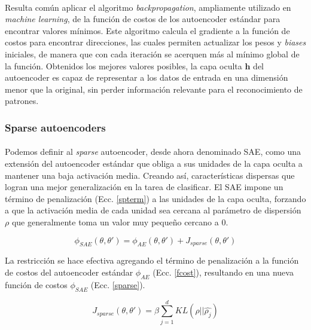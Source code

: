 \documentclass[12pt]{article}%
\begin{document}
\paragraph{}
Resulta común aplicar el algoritmo \textit{backpropagation}, ampliamente utilizado en \textit{machine learning}, de la función de costos de los autoencoder estándar para encontrar valores mínimos. Este algoritmo calcula el gradiente a la función de costos para encontrar direcciones, las cuales permiten actualizar los pesos y \textit{biases} iniciales, de manera que con cada iteración se acerquen más al mínimo global de la función. Obtenidos los mejores valores posibles, la capa oculta $\textbf{h}$ del autoencoder es capaz de representar a los datos de entrada en una dimensión menor que la original, sin perder información relevante para el reconocimiento de patrones.

\subsubsection{Sparse autoencoders}

\paragraph{}
Podemos definir al \textit{sparse} autoencoder, desde ahora denominado SAE, como una extensión del autoencoder estándar que obliga a sus unidades de la capa oculta a mantener una baja activación media. Creando así, características dispersas que logran una mejor generalización en la tarea de clasificar\cite{du}. El SAE impone un término de penalización (Ecc. \ref{spterm}) a las unidades de la capa oculta, forzando a que la activación media de cada unidad sea cercana al parámetro de dispersión $\rho$ que generalmente toma un valor muy pequeño cercano a 0. 

\begin{equation}
\label{sparse}
\phi_{SAE}(\theta,\theta')=\phi_{AE}(\theta,\theta')+J_{sparse}(\theta,\theta')
\end{equation}

La restricción se hace efectiva agregando el término de penalización a la función de costos del autoencoder estándar $\phi_{AE}$ (Ecc. \ref{fcost}), resultando en una nueva función de costos $\phi_{SAE}$ (Ecc. \ref{sparse}).

\begin{equation}
\label{spterm}
J_{sparse}(\theta,\theta')=\beta\sum_{j=1}^{d}KL(\rho||\hat{\rho_{j}})
\end{equation} 
\end{document}
